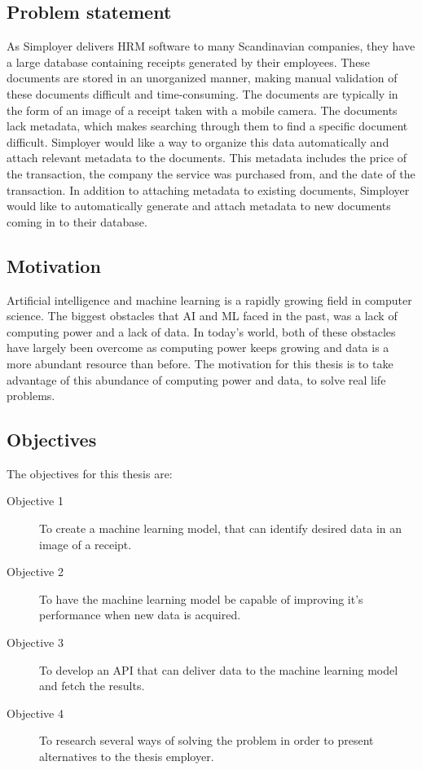 \subsection{Problem statement}\label{subsec:problem-statement}
As Simployer delivers HRM software to many Scandinavian companies, they have a large database containing receipts generated by their employees.
These documents are stored in an unorganized manner, making manual validation of these documents difficult and time-consuming.
The documents are typically in the form of an image of a receipt taken with a mobile camera.
The documents lack metadata, which makes searching through them to find a specific document difficult.
Simployer would like a way to organize this data automatically and attach relevant metadata to the documents.
This metadata includes the price of the transaction, the company the service was purchased from, and the date of the transaction.
In addition to attaching metadata to existing documents, Simployer would like to automatically generate and attach metadata to new documents coming in to their database.

\subsection{Motivation}\label{subsec:motivation}
Artificial intelligence and machine learning is a rapidly growing field in computer science.
The biggest obstacles that AI and ML faced in the past, was a lack of computing power and a lack of data.
In today's world, both of these obstacles have largely been overcome as computing power keeps growing and data is a
more abundant resource than before.
The motivation for this thesis is to take advantage of this abundance of computing power and data, to solve real life
problems.

\subsection{Objectives}\label{subsec:objectives}
The objectives for this thesis are:
\begin{description}
    \item[Objective 1] To create a machine learning model, that can identify desired data in an image of a receipt.
    \item[Objective 2] To have the machine learning model be capable of improving it's performance when new data is acquired.
    \item[Objective 3] To develop an API that can deliver data to the machine learning model and fetch the results.
    \item[Objective 4] To research several ways of solving the problem in order to present alternatives to the thesis employer.
\end{description}


